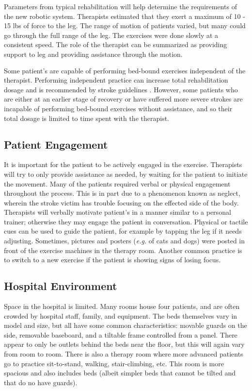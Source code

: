 \documentclass[12pt]{report}
\begin{document}
	Parameters from typical rehabilitation will help determine the requirements of the new robotic system. Therapists estimated that they exert a maximum of 10 - 15 lbs of force to the leg. The range of motion of patients varied, but many could go through the full range of the leg. The exercises were done slowly at a consistent speed. The role of the therapist can be summarized as providing support to leg and providing assistance through the motion. 
	
	Some patient's are capable of performing bed-bound exercises independent of the therapist. Performing independent practice can increase total rehabilitation dosage and is recommended by stroke guidelines \cite{Hebert2016}. However, some patients who are either at an earlier stage of recovery or have suffered more severe strokes are incapable of performing bed-bound exercises without assistance, and so their total dosage is limited to time spent with the therapist. 
	
	\subsection{Patient Engagement} 
	 It is important for the patient to be actively engaged in the exercise. Therapists will try to only provide assistance as needed, by waiting for the patient to initiate the movement. Many of the patients required verbal or physical engagement throughout the process. This is in part due to a phenomenon known as neglect, wherein the stroke victim has trouble focusing on the effected side of the body. Therapists will verbally motivate patient's in a manner similar to a personal trainer; otherwise they may engage the patient in conversation. Physical or tactile cues can be used to guide the patient, for example by tapping the leg if it needs adjusting. Sometimes, pictures and posters (\textit{e.g.} of cats and dogs) were posted in front of the exercise machines in the therapy room. Another common practice is to switch to a new exercise if the patient is showing signs of losing focus. 
	 
	 \subsection{Hospital Environment}
	Space in the hospital is limited. Many rooms house four patients, and are often crowded by hospital staff, family, and equipment. The beds themselves vary in model and size, but all have some common characteristics: movable guards on the side, removable baseboard, and a tiltable frame controlled from a panel. There appear to only be outlets behind the beds near the floor, but this will again vary from room to room. 
	There is also a therapy room where more advanced patients go to practice sit-to-stand, walking, stair-climbing, etc. This room is more spacious and also includes beds (albeit simpler beds that cannot be tilted and that do no have guards). 
	
\end{document}
